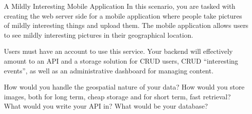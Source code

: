 \documentclass{homework}
\begin{document}
\newpage
\begin{problem}[4]{A Mildly Interesting Mobile Application}
    In this scenario, you are tasked with creating the web server side for a mobile application where people take pictures of mildly interesting things and upload them. The mobile application allows users to see mildly interesting pictures in their geographical location.
    
    \vskip 1mm

    Users must have an account to use this service. Your backend will effectively amount to an API and a storage solution for CRUD users, CRUD ``interesting events'', as well as an administrative dashboard for managing content.
    
    \vskip 1mm

    How would you handle the geospatial nature of your data? How would you store images, both for long term, cheap storage and for short term, fast retrieval? What would you write your API in? What would be your database?
\end{problem}
\end{document}
